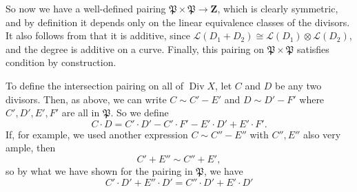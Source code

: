 {So now we have a well-defined pairing $\mathfrak P\times\mathfrak P\to\mathbf Z$, which is clearly symmetric, and by definition it depends only on the linear equivalence classes of the divisors. It also follows from  that it is additive, since $\mathcal L(D_1+D_2)\cong\mathcal L(D_1)\otimes\mathcal L(D_2)$, and the degree is additive on a curve. Finally, this pairing on $\mathfrak P\times\mathfrak P$ satisfies condition  by construction.

To define the intersection pairing on all of $\operatorname{Div}X$, let $C$ and $D$ be any two divisors. Then, as above, we can write $C\sim C'-E'$ and $D\sim D'-F'$ where $C',D',E',F'$ are all in $\mathfrak P$. So we define
\[
C\cdot D=C'\cdot D'-C'\cdot F'-E'\cdot D'+E'\cdot F'.
\]
If, for example, we used another expression $C\sim C''-E''$ with $C'',E''$ also very ample, then
\[
C'+E''\sim C''+E',
\]
so by what we have shown for the pairing in $\mathfrak P$, we have
\[
C'\cdot D'+E''\cdot D'=C''\cdot D'+E'\cdot D'
\]
}
